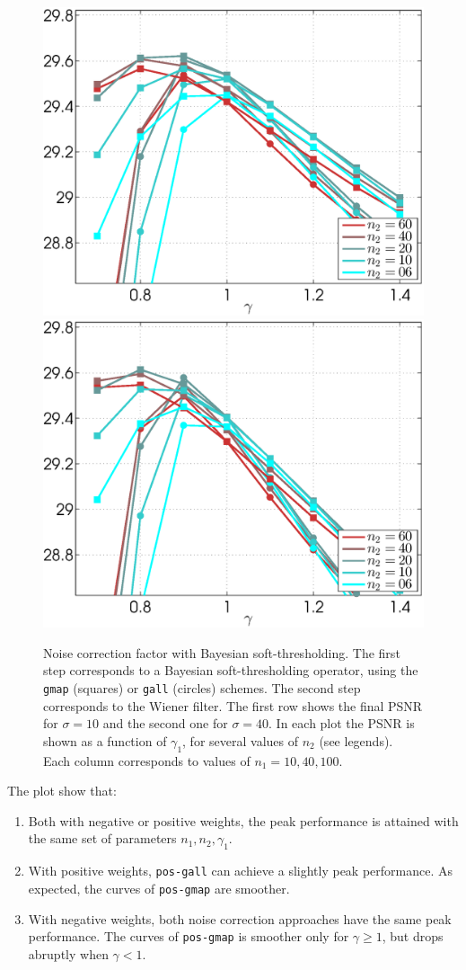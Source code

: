 \documentclass{ipol}
\begin{document}
\begin{figure}[ht!]
	\includegraphics[width=.33\textwidth]{f/nldct/STB1WIE2-vs-STBB2F1WIE2_fpsnr_np2-g-curves_1np040_s40_average.eps}%
	\includegraphics[width=.33\textwidth]{f/nldct/STB1WIE2-vs-STBB2F1WIE2_fpsnr_np2-g-curves_1np100_s40_average.eps}\\

	\caption{Noise correction factor with Bayesian soft-thresholding.
		The first step corresponds to a Bayesian soft-thresholding operator, 
		using the \texttt{gmap} (squares) or \texttt{gall} (circles) schemes. 
		The second step corresponds to the Wiener filter.
		The first row shows the final PSNR for $\sigma =
		10$ and the second one for $\sigma = 40$. In each plot the PSNR is shown
		as a function of $\gamma_1$, for several values of $n_2$ (see legends).
		Each column corresponds to values of $n_1 = 10, 40, 100$. }
	\label{fig:stb1_gmap-vs-gall}
\end{figure}

The plot show that:
\begin{enumerate}
	\item Both with negative or positive weights, the peak performance is
		attained with the same set of parameters $n_1, n_2, \gamma_1$.
	\item With positive weights, \verb+pos-gall+ can achieve a slightly peak performance.
		As expected, the curves of \verb+pos-gmap+ are smoother.
	\item With negative weights, both noise correction approaches have the same
		peak performance. The curves of \verb+pos-gmap+ is smoother only for
		$\gamma \geqslant 1$, but drops abruptly when $\gamma < 1$.
\end{enumerate}
\end{document}
